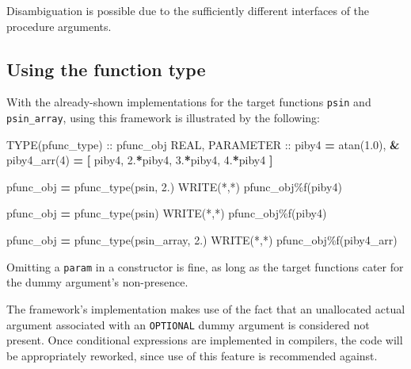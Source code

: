 \documentclass[
]{article}
\newenvironment{Shaded}{}{}
\newcommand{\BuiltInTok}[1]{\textcolor[rgb]{0.00,0.50,0.00}{#1}}
\newcommand{\DataTypeTok}[1]{\textcolor[rgb]{0.56,0.13,0.00}{#1}}
\newcommand{\DecValTok}[1]{\textcolor[rgb]{0.25,0.63,0.44}{#1}}
\newcommand{\FloatTok}[1]{\textcolor[rgb]{0.25,0.63,0.44}{#1}}
\newcommand{\FunctionTok}[1]{\textcolor[rgb]{0.02,0.16,0.49}{#1}}
\newcommand{\KeywordTok}[1]{\textcolor[rgb]{0.00,0.44,0.13}{\textbf{#1}}}
\newcommand{\NormalTok}[1]{#1}
\newcommand{\OperatorTok}[1]{\textcolor[rgb]{0.40,0.40,0.40}{#1}}
\begin{document}
Disambiguation is possible due to the sufficiently different interfaces
of the procedure arguments.

\subsection{Using the function type}\label{using-the-function-type}

With the already-shown implementations for the target functions
\texttt{psin} and \texttt{psin\_array}, using this framework is
illustrated by the following:

\begin{Shaded}
\begin{Highlighting}[]
\DataTypeTok{TYPE(pfunc\_type)} \DataTypeTok{::}\NormalTok{ pfunc\_obj}
\DataTypeTok{REAL}\NormalTok{, }\DataTypeTok{PARAMETER} \DataTypeTok{::}\NormalTok{ piby4 }\KeywordTok{=} \BuiltInTok{atan}\NormalTok{(}\FloatTok{1.0}\NormalTok{), }\KeywordTok{\&}
\NormalTok{   piby4\_arr(}\DecValTok{4}\NormalTok{) }\KeywordTok{=} \KeywordTok{[}\NormalTok{ piby4, }\FloatTok{2.}\KeywordTok{*}\NormalTok{piby4, }\FloatTok{3.}\KeywordTok{*}\NormalTok{piby4, }\FloatTok{4.}\KeywordTok{*}\NormalTok{piby4 }\KeywordTok{]}

\NormalTok{pfunc\_obj }\KeywordTok{=}\NormalTok{ pfunc\_type(psin, }\FloatTok{2.}\NormalTok{)}
\FunctionTok{WRITE(*}\NormalTok{,}\FunctionTok{*)}\NormalTok{ pfunc\_obj}\OperatorTok{\%}\NormalTok{f(piby4)}

\NormalTok{pfunc\_obj }\KeywordTok{=}\NormalTok{ pfunc\_type(psin)}
\FunctionTok{WRITE(*}\NormalTok{,}\FunctionTok{*)}\NormalTok{ pfunc\_obj}\OperatorTok{\%}\NormalTok{f(piby4)}

\NormalTok{pfunc\_obj }\KeywordTok{=}\NormalTok{ pfunc\_type(psin\_array, }\FloatTok{2.}\NormalTok{)}
\FunctionTok{WRITE(*}\NormalTok{,}\FunctionTok{*)}\NormalTok{ pfunc\_obj}\OperatorTok{\%}\NormalTok{f(piby4\_arr)}
\end{Highlighting}
\end{Shaded}

Omitting a \texttt{param} in a constructor is fine, as long as the
target functions cater for the dummy argument's non-presence.

The framework's implementation makes use of the fact that an unallocated
actual argument associated with an \texttt{OPTIONAL} dummy argument is
considered not present. Once conditional expressions are implemented in
compilers, the code will be appropriately reworked, since use of this
feature is recommended against.
\end{document}
